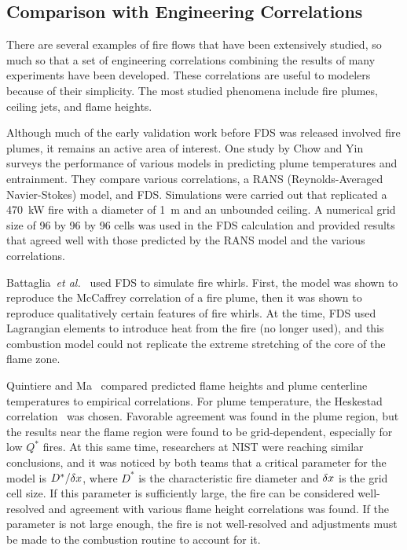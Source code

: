\subsection{Comparison with Engineering Correlations}

There are  several examples of  fire flows that have  been extensively studied, so much  so that a set of  engineering correlations combining the
results  of   many  experiments   have  been   developed.  These correlations are  useful to modelers because of  their simplicity. The most studied
phenomena include fire  plumes, ceiling jets,  and flame heights.

Although much  of the  early validation work  before FDS  was released involved fire plumes, it remains an active area of interest. One study by
Chow  and Yin~\cite{Chow:1}  surveys  the  performance of  various models in predicting plume temperatures and entrainment.  They compare various
correlations, a  RANS (Reynolds-Averaged Navier-Stokes) model, and FDS.  Simulations  were carried out that replicated  a 470~kW fire with a
diameter of  1~m and an  unbounded ceiling.  A  numerical grid size of  96 by  96 by  96 cells was  used in  the FDS  calculation and provided
results  that agreed  well with those  predicted by  the RANS model and the various correlations.

Battaglia~{\em  et al.}~\cite{Battaglia:1} used  FDS to  simulate fire whirls.   First,  the  model  was  shown to  reproduce  the  McCaffrey
correlation  of  a  fire  plume,   then  it  was  shown  to  reproduce qualitatively certain features  of fire whirls. At the  time, FDS used
Lagrangian elements to introduce heat  from the fire (no longer used), and this  combustion model could not replicate  the extreme stretching of the
core of the flame zone.

Quintiere and Ma~\cite{Ma:2,Ma:3} compared predicted flame heights and plume  centerline temperatures to  empirical correlations.   For plume
temperature,   the  Heskestad   correlation~\cite{SFPE:Heskestad}  was chosen.  Favorable  agreement was found  in the plume region,  but the results
near  the  flame  region  were found  to  be  grid-dependent, especially for  low $Q^*$  fires.  At this  same time,  researchers at NIST were
reaching similar  conclusions, and it  was noticed  by both teams  that a  critical parameter  for the  model is  $D^*/\delta x$, where $D^*$ is the
characteristic fire diameter and $\delta x$  is the grid cell size.  If  this parameter  is  sufficiently  large,  the fire  can  be considered
well-resolved  and  agreement  with various  flame  height correlations was found. If the parameter is not large enough, the fire is not
well-resolved and adjustments  must be made to  the combustion routine to account for it.



